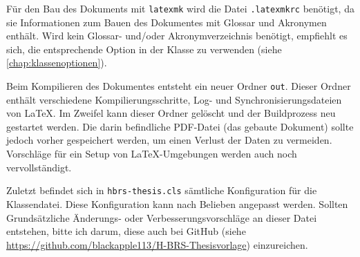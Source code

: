 Für den Bau des Dokuments mit \texttt{latexmk} wird die Datei \texttt{.latexmkrc} benötigt, da sie Informationen zum Bauen des Dokumentes mit Glossar und Akronymen enthält. Wird kein Glossar- und/oder Akronymverzeichnis benötigt, empfiehlt es sich, die entsprechende Option in der Klasse zu verwenden (siehe \autoref{chap:klassenoptionen}).

Beim Kompilieren des Dokumentes entsteht ein neuer Ordner \texttt{out}. Dieser Ordner enthält verschiedene Kompilierungsschritte, Log- und Synchronisierungsdateien von \LaTeX. Im Zweifel kann dieser Ordner gelöscht und der Buildprozess neu gestartet werden. Die darin befindliche PDF-Datei (das gebaute Dokument) sollte jedoch vorher gespeichert werden, um einen Verlust der Daten zu vermeiden. Vorschläge für ein Setup von \LaTeX-Umgebungen werden auch noch vervollständigt.

Zuletzt befindet sich in \texttt{hbrs-thesis.cls} sämtliche Konfiguration für die Klassendatei. Diese Konfiguration kann nach Belieben angepasst werden. Sollten Grundsätzliche Änderungs- oder Verbesserungsvorschläge an dieser Datei entstehen, bitte ich darum, diese auch bei GitHub (siehe \url{https://github.com/blackapple113/H-BRS-Thesisvorlage}) einzureichen.